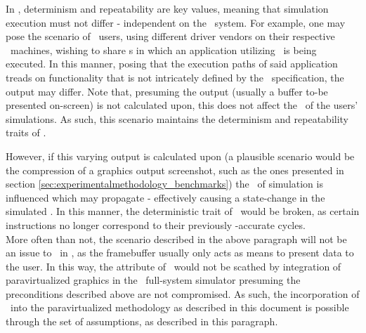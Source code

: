 In \dvttermsimics , determinism and repeatability are key values, meaning that simulation execution must not differ - independent on the \dvttermhost\ system.
For example, one may pose the scenario of \dvttermsimics\ users, using different driver vendors on their respective \dvttermhost\ machines, wishing to share \dvttermcheckpoint s in which an application utilizing \dvttermopengles\ is being executed.
In this manner, posing that the execution paths of said application treads on functionality that is not intricately defined by the \dvttermopengles\ specification, the output may differ.
Note that, presuming the output (usually a buffer to-be presented on-screen) is not calculated upon, this does not affect the \dvttermtiming\ of the users' simulations.
As such, this scenario maintains the determinism and repeatability traits of \dvttermsimics .

However, if this varying output is calculated upon (a plausible scenario would be the compression of a graphics output screenshot, such as the ones presented in section \ref{sec:experimentalmethodology_benchmarks}) the \dvttermtiming\ of simulation is influenced which may propagate - effectively causing a state-change in the simulated \dvttermcpu .
In this manner, the deterministic trait of \dvttermsimics\ would be broken, as certain instructions no longer correspond to their previously \dvttermtiming -accurate cycles.\\

\noindent
More often than not, the scenario described in the above paragraph will not be an issue to \dvttermdeterministicexecution\ in \dvttermsimics , as the framebuffer usually only acts as means to present data to the user.
In this way, the attribute of \dvttermdeterministicexecution\ would not be scathed by integration of paravirtualized graphics in the \dvttermsimics\ full-system simulator presuming the preconditions described above are not compromised.
As such, the incorporation of \dvttermdeterministicexecution\ into the paravirtualized methodology as described in this document is possible through the set of assumptions, as described in this paragraph.

